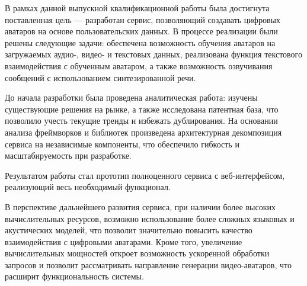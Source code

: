 

В рамках данной выпускной квалификационной работы была достигнута поставленная цель — разработан сервис, позволяющий создавать цифровых аватаров на основе пользовательских данных. В процессе реализации были решены следующие задачи: обеспечена возможность обучения аватаров на загружаемых аудио-, видео- и текстовых данных, реализована функция текстового взаимодействия с обученным аватаром, а также возможность озвучивания сообщений с использованием синтезированной речи.

До начала разработки была проведена аналитическая работа: изучены существующие решения на рынке, а также исследована патентная база, что позволило учесть текущие тренды и избежать дублирования. На основании анализа фреймворков и библиотек произведена архитектурная декомпозиция сервиса на независимые компоненты, что обеспечило гибкость и масштабируемость при разработке.

Результатом работы стал прототип полноценного сервиса с веб-интерфейсом, реализующий весь необходимый функционал.

В перспективе дальнейшего развития сервиса, при наличии более высоких вычислительных ресурсов, возможно использование более сложных языковых и акустических моделей, что позволит значительно повысить качество взаимодействия с цифровыми аватарами. Кроме того, увеличение вычислительных мощностей откроет возможность ускоренной обработки запросов и позволит рассматривать направление генерации видео-аватаров, что расширит функциональность системы.